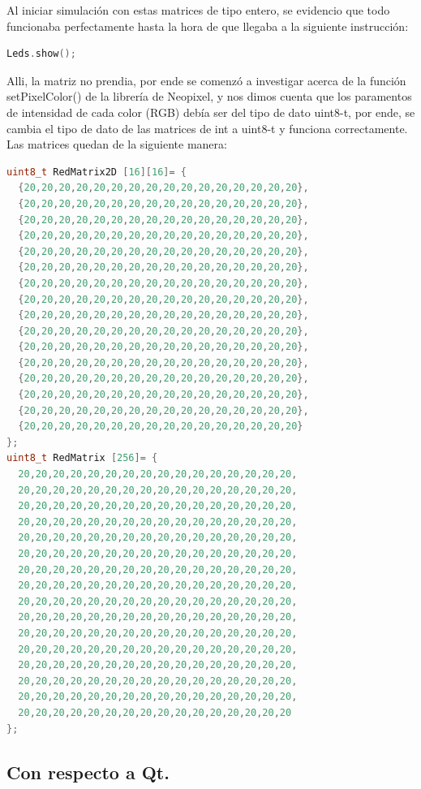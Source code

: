 \documentclass{article}
\begin{document}
Al iniciar simulación con estas matrices de tipo entero, se evidencio que todo funcionaba perfectamente hasta la hora de que llegaba a la siguiente instrucción:
\begin{lstlisting}[language=C++, label=show]
Leds.show();
\end{lstlisting}
Alli, la matriz no prendia, por ende se comenzó a investigar acerca de la función setPixelColor() de la librería de Neopixel, y nos dimos cuenta que los paramentos de intensidad de cada color (RGB) debía ser del tipo de dato uint8-t, por ende, se cambia el tipo de dato de las matrices de int a uint8-t y funciona correctamente.
Las matrices quedan de la siguiente manera:
\begin{lstlisting}[language=C++, label=codigo_matrices_uint]
uint8_t RedMatrix2D [16][16]= {
  {20,20,20,20,20,20,20,20,20,20,20,20,20,20,20,20},
  {20,20,20,20,20,20,20,20,20,20,20,20,20,20,20,20},
  {20,20,20,20,20,20,20,20,20,20,20,20,20,20,20,20},
  {20,20,20,20,20,20,20,20,20,20,20,20,20,20,20,20},
  {20,20,20,20,20,20,20,20,20,20,20,20,20,20,20,20},
  {20,20,20,20,20,20,20,20,20,20,20,20,20,20,20,20},
  {20,20,20,20,20,20,20,20,20,20,20,20,20,20,20,20},
  {20,20,20,20,20,20,20,20,20,20,20,20,20,20,20,20},
  {20,20,20,20,20,20,20,20,20,20,20,20,20,20,20,20},
  {20,20,20,20,20,20,20,20,20,20,20,20,20,20,20,20},
  {20,20,20,20,20,20,20,20,20,20,20,20,20,20,20,20},
  {20,20,20,20,20,20,20,20,20,20,20,20,20,20,20,20},
  {20,20,20,20,20,20,20,20,20,20,20,20,20,20,20,20},
  {20,20,20,20,20,20,20,20,20,20,20,20,20,20,20,20},
  {20,20,20,20,20,20,20,20,20,20,20,20,20,20,20,20},
  {20,20,20,20,20,20,20,20,20,20,20,20,20,20,20,20}
};
uint8_t RedMatrix [256]= {
  20,20,20,20,20,20,20,20,20,20,20,20,20,20,20,20,
  20,20,20,20,20,20,20,20,20,20,20,20,20,20,20,20,
  20,20,20,20,20,20,20,20,20,20,20,20,20,20,20,20,
  20,20,20,20,20,20,20,20,20,20,20,20,20,20,20,20,
  20,20,20,20,20,20,20,20,20,20,20,20,20,20,20,20,
  20,20,20,20,20,20,20,20,20,20,20,20,20,20,20,20,
  20,20,20,20,20,20,20,20,20,20,20,20,20,20,20,20,
  20,20,20,20,20,20,20,20,20,20,20,20,20,20,20,20,
  20,20,20,20,20,20,20,20,20,20,20,20,20,20,20,20,
  20,20,20,20,20,20,20,20,20,20,20,20,20,20,20,20,
  20,20,20,20,20,20,20,20,20,20,20,20,20,20,20,20,
  20,20,20,20,20,20,20,20,20,20,20,20,20,20,20,20,
  20,20,20,20,20,20,20,20,20,20,20,20,20,20,20,20,
  20,20,20,20,20,20,20,20,20,20,20,20,20,20,20,20,
  20,20,20,20,20,20,20,20,20,20,20,20,20,20,20,20,
  20,20,20,20,20,20,20,20,20,20,20,20,20,20,20,20
};
\end{lstlisting}
\subsection{Con respecto a Qt.}


\end{document}
